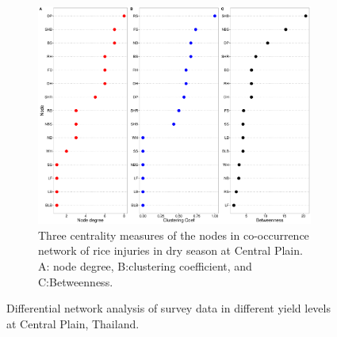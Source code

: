 \begin{figure}
\begin{subfigure}[b]{0.9\textwidth}
        \includegraphics[width = 1\textwidth]{figures/yield_dif_nodepropCentral_Plain/yield_dif_nodepropCentral_Plain.pdf}
        \caption[Three centrality measures of the nodes in co-occurrence network of rice injuries in dry season at Central Plain.]{Three centrality measures of the nodes in co-occurrence network of rice injuries in dry season at Central Plain. A: node degree, B:clustering coefficient, and C:Betweenness.}
        \label{fig:nodepropdifyield_CP}
    \end{subfigure}
    \caption{Differential network analysis of survey data in different yield levels at Central Plain, Thailand.}
    \label{fig:difyield_CP}
\end{figure}
 
